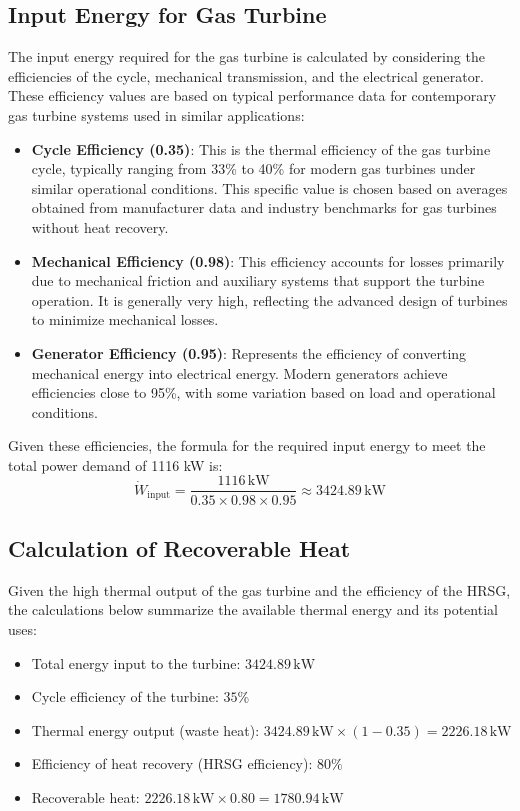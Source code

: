 \documentclass{article}
\begin{document}
\subsection{Input Energy for Gas Turbine}
The input energy required for the gas turbine is calculated by considering the efficiencies of the cycle, mechanical transmission, and the electrical generator. These efficiency values are based on typical performance data for contemporary gas turbine systems used in similar applications:
\begin{itemize}
    \item \textbf{Cycle Efficiency (0.35)}: This is the thermal efficiency of the gas turbine cycle, typically ranging from 33\% to 40\% for modern gas turbines under similar operational conditions. This specific value is chosen based on averages obtained from manufacturer data and industry benchmarks for gas turbines without heat recovery.
    \item \textbf{Mechanical Efficiency (0.98)}: This efficiency accounts for losses primarily due to mechanical friction and auxiliary systems that support the turbine operation. It is generally very high, reflecting the advanced design of turbines to minimize mechanical losses.
    \item \textbf{Generator Efficiency (0.95)}: Represents the efficiency of converting mechanical energy into electrical energy. Modern generators achieve efficiencies close to 95\%, with some variation based on load and operational conditions.
\end{itemize}

Given these efficiencies, the formula for the required input energy to meet the total power demand of 1116 kW is:
\[
\dot{W}_{\text{input}} = \frac{1116 \, \text{kW}}{0.35 \times 0.98 \times 0.95} \approx 3424.89 \, \text{kW}
\]

\subsection{Calculation of Recoverable Heat}
Given the high thermal output of the gas turbine and the efficiency of the HRSG, the calculations below summarize the available thermal energy and its potential uses:
\begin{itemize}
    \item Total energy input to the turbine: \(3424.89 \, \text{kW}\)
    \item Cycle efficiency of the turbine: \(35\%\)
    \item Thermal energy output (waste heat): \(3424.89 \, \text{kW} \times (1 - 0.35) = 2226.18 \, \text{kW}\)
    \item Efficiency of heat recovery (HRSG efficiency): \(80\%\)
    \item Recoverable heat: \(2226.18 \, \text{kW} \times 0.80 = 1780.94 \, \text{kW}\)
\end{itemize}
\end{document}
